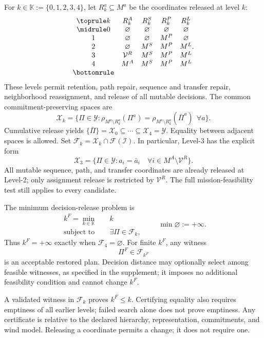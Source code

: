 For $k\in\mathbb K:=\{0,1,2,3,4\}$, let $R_k^a\subseteq M^a$ be the
coordinates released at level $k$:
\begin{equation}
\begin{array}{@{}ccccc@{}}
\toprule
k&R_k^A&R_k^S&R_k^P&R_k^L\\
\midrule
0&\varnothing&\varnothing&\varnothing&\varnothing\\
1&\varnothing&\varnothing&M^P&\varnothing\\
2&\varnothing&M^S&M^P&M^L\\
3&\mathcal V^R&M^S&M^P&M^L\\
4&M^A&M^S&M^P&M^L\\
\bottomrule
\end{array}.
\label{eq:release_schedule}
\end{equation}
These levels permit retention, path repair, sequence and transfer repair,
neighborhood reassignment, and release of all \mbox{mutable} decisions.
The common commitment-preserving spaces are
\begin{equation}
\mathcal X_k=\{\Pi\in\mathcal Y:
\rho_{M^a\setminus R_k^a}(\Pi^a)
=\rho_{M^a\setminus R_k^a}(\bar\Pi^a)\ \ \forall a\}.
\label{eq:intervention_space}
\end{equation}
Cumulative release yields
$\{\bar\Pi\}=\mathcal X_0\subseteq\cdots\subseteq\mathcal X_4=\mathcal Y$.
Equality between adjacent spaces is allowed. Set
$\mathcal F_k=\mathcal X_k\cap\mathcal F(\mathscr I)$.
In particular, Level-3 has the explicit form
\begin{equation}
\mathcal X_3=\{\Pi\in\mathcal Y:
a_i=\bar a_i\quad\forall i\in M^A\setminus\mathcal V^R\}.
\label{eq:level_three_space}
\end{equation}
All mutable sequence, path, and transfer coordinates are already released
at Level-2; only assignment release is restricted by $\mathcal V^R$.
The full mission-feasibility test still applies to every candidate.

The minimum decision-release problem is
\begin{equation}
\begin{aligned}
k^F=\min_{k\in\mathbb K}\quad &k\\
\text{subject to}\quad &\exists\Pi\in\mathcal F_k,
\end{aligned}
\qquad \min\varnothing:=+\infty.
\label{eq:feasibility_escalation}
\end{equation}
Thus $k^F=+\infty$ exactly when $\mathcal F_4=\varnothing$.
For finite $k^F$, any witness
\begin{equation}
\Pi^F\in\mathcal F_{k^F}
\label{eq:feasible_selection}
\end{equation}
is an acceptable restored plan. Decision distance may optionally select
among feasible witnesses, as specified in the supplement; it imposes no
additional feasibility condition and cannot change $k^F$.

A validated witness in $\mathcal F_k$ proves $k^F\le k$.
Certifying equality also requires emptiness of all earlier levels;
failed search alone does not prove emptiness. Any certificate is relative
to the declared hierarchy, representation, commitments, and wind model.
Releasing a coordinate permits a change; it does not require one.

